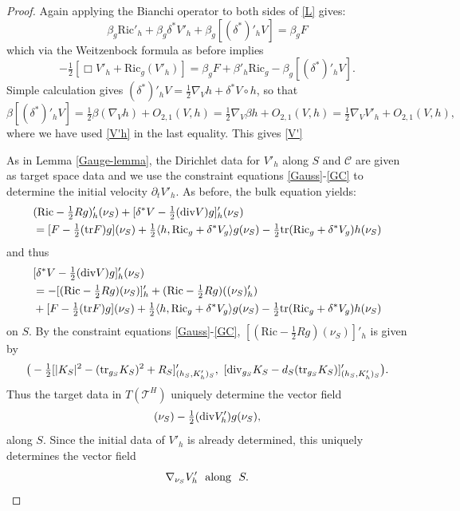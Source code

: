 \documentclass[10pt]{amsart}
\renewcommand{\b}{\beta}
\renewcommand{\d}{\delta}
\newcommand{\cC}{{\mathcal C}}
\newcommand{\cT}{{\mathcal T}}
\newcommand{\Ric}{\mathrm{Ric}}
\newcommand{\be}{\begin{equation}}
\newcommand{\ee}{\end{equation}}
\newcommand{\bes}{\begin{equation*}}
\newcommand{\ees}{\end{equation*}}
\newcommand{\tr}{\mathrm{tr}}
\newcommand{\p}{\partial}
\newcommand{\<}{\langle}
\renewcommand{\>}{\rangle}
\theoremstyle{plain}
\theoremstyle{remark}
\theoremstyle{definition}
\numberwithin{equation}{section}
\begin{document}
\begin{proof}
Again applying the Bianchi operator to both sides of \eqref{L} gives:
\bes
\b_g \Ric'_h+\b_g \d^* V'_h+\b_g[(\d^*)'_h V]=\b_g F
\ees
which via the Weitzenbock formula as before implies 
\be \label{V'1}
-\tfrac{1}{2}[\Box V'_h+\Ric_g(V'_h)]=\b_g F + \b'_h \Ric_g -\b_g[(\d^*)'_h V].
\ee
Simple calculation gives $(\d^*)'_hV = \frac{1}{2}\nabla_V h + \d^*V\circ h$, so that 
 $$\b[(\d^*)'_hV] = \tfrac{1}{2}\b(\nabla_Vh) + O_{2,1}(V,h) = \tfrac{1}{2}\nabla_V \b h + O_{2,1}(V,h) = \tfrac{1}{2}\nabla_V V'_h + O_{2,1}(V,h),$$
where we have used \eqref{V'h} in the last equality. This gives \eqref{V'} 

  As in Lemma \ref{Gauge-lemma}, the Dirichlet data for $V'_h$ along $S$ and $\cC$ are given as target space data and we use the 
constraint equations \eqref{Gauss}-\eqref{GC} to determine the initial velocity $\p_t V'_h$. As before, the bulk equation yields:
\bes
\begin{split}
&(\Ric-\tfrac{1}{2}Rg)'_h(\nu_S)+[\d^*V-\tfrac{1}{2}({\rm div}V)g]'_h(\nu_S)\\
&=[F-\tfrac{1}{2}(\tr F)g](\nu_S)+\tfrac{1}{2}\<h,\Ric_g+\d^* V_g\>g(\nu_S)-
\tfrac{1}{2}\tr(\Ric_g+\d^* V_g)h(\nu_S)
\end{split}\ees
and thus
\bes\begin{split}
&[\d^*V-\tfrac{1}{2}({\rm div}V)g]'_h(\nu_S)\\
&=-[(\Ric-\tfrac{1}{2}Rg)(\nu_S)]'_h+(\Ric-\tfrac{1}{2}Rg)((\nu_S)'_h)\\
&+[F-\tfrac{1}{2}(\tr F)g](\nu_S)+\tfrac{1}{2}\<h,\Ric_g+\d^* V_g\>g(\nu_S)-
\tfrac{1}{2}\tr(\Ric_g+\d^* V_g)h(\nu_S)
\end{split}\ees
on $S$.
By the constraint equations \eqref{Gauss}-\eqref{GC}, $[(\Ric-\tfrac{1}{2}Rg)(\nu_S)]'_h$ is given by 
\bes
\big(-\tfrac{1}{2}[|K_S|^2-(\tr_{g_S}K_S)^2+R_S]'_{(h_S,K'_h)_S},~[{\rm div}_{g_S}K_S-d_S(\tr_{g_S}K_S)]'_{(h_S,K'_h)_S}\big).
\ees
Thus the target data in $T(\cT^H)$ uniquely determine the vector field 
\bes
[\d^*V'_h](\nu_S)-\tfrac{1}{2}({\rm div}V'_h)g(\nu_S),
\ees
along $S$. Since the initial data of $V'_h$ is already determined, this uniquely determines the vector field 
\be
\nabla_{\nu_S} V'_h \ \ {\rm along} \ \ S.
\ee

\end{proof}
\end{document}
